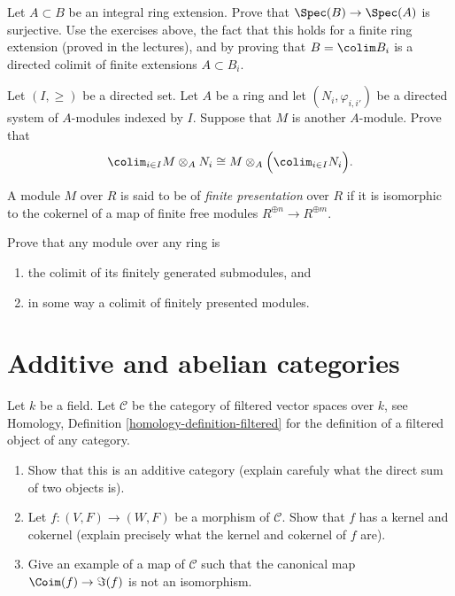 \begin{exercise}
\label{exercise-integral-colimit-finite}
Let $A \subset B$ be an integral ring extension. Prove that
$\Spec(B) \to \Spec(A)$ is surjective.
Use the exercises above, the fact that this holds for a finite ring
extension (proved in the lectures), and by proving that
$B = \colim B_i$ is a directed colimit of finite extensions $A \subset B_i$.
\end{exercise}

\begin{exercise}
\label{exercise-colimit-tensor}
Let $(I, \geq)$ be a directed set.
Let $A$ be a ring and let $(N_i, \varphi_{i, i'})$ be a directed system of
$A$-modules indexed by $I$. Suppose that $M$ is another $A$-module. Prove
that
$$
\colim_{i\in I} M \otimes_A N_i\cong
M \otimes_A \Big( \colim_{i\in I} N_i\Big).
$$
\end{exercise}

\begin{definition}
\label{definition-finite-presentation}
A module $M$ over $R$ is said to be of {\it finite presentation} over
$R$ if it  is isomorphic to the cokernel of a map of finite free modules
$ R^{\oplus n} \to R^{\oplus m}$.
\end{definition}

\begin{exercise}
\label{exercise-colimit-modules}
Prove that any module over any ring is
\begin{enumerate}
\item the colimit of its finitely generated submodules, and
\item in some way a colimit of finitely presented modules.
\end{enumerate}
\end{exercise}





\section{Additive and abelian categories}
\label{section-additive}

\begin{exercise}
\label{exercise-filtered-vector-spaces}
Let $k$ be a field. Let $\mathcal{C}$ be the category of filtered vector
spaces over $k$, see
Homology, Definition \ref{homology-definition-filtered}
for the definition of a filtered object of any category.
\begin{enumerate}
\item Show that this is an additive category (explain carefuly what the
direct sum of two objects is).
\item Let $f : (V, F) \to (W, F)$ be a morphism of $\mathcal{C}$.
Show that $f$ has a kernel and cokernel (explain precisely
what the kernel and cokernel of $f$ are).
\item Give an example of a map of $\mathcal{C}$ such that
the canonical map $\Coim(f) \to \Im(f)$ is not an isomorphism.
\end{enumerate}
\end{exercise}

